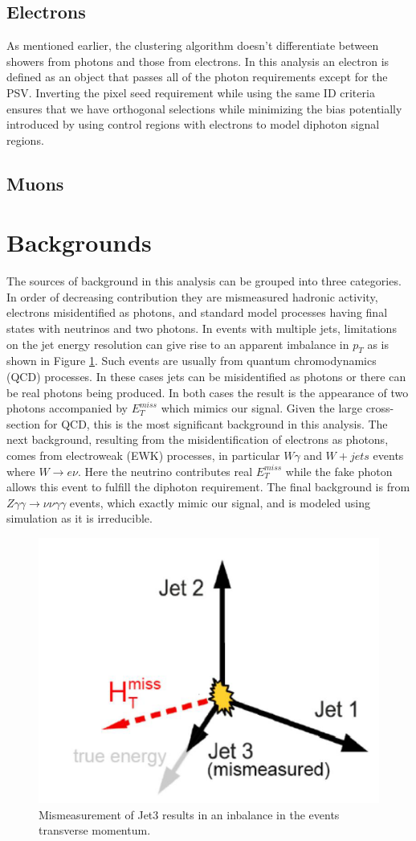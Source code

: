 \subsection{Electrons}
As mentioned earlier, the clustering algorithm doesn't differentiate between showers from photons and those from electrons.  In this analysis an electron is defined as an object that passes all of the photon requirements except for the PSV.  Inverting the pixel seed requirement while using the same ID criteria ensures that we have orthogonal selections while minimizing the bias potentially introduced by using control regions with electrons to model diphoton signal regions. 


\subsection{Muons}

\section{Backgrounds}
The sources of background in this analysis can be grouped into three categories.  In order of decreasing contribution they are mismeasured hadronic activity, electrons misidentified as photons, and standard model processes having final states with neutrinos and two photons.  In events with multiple jets, limitations on the jet energy resolution can give rise to an apparent imbalance in $p_T$ as is shown in Figure \ref{fig:fakemet}.  Such events are usually from quantum chromodynamics (QCD) processes.  In these cases jets can be misidentified as photons or there can be real photons being produced.  In both cases the result is the appearance of two photons accompanied by $E^{miss}_T$ which mimics our signal.  Given the large cross-section for QCD, this is the most significant background in this analysis.  The next background, resulting from the misidentification of electrons as photons, comes from electroweak (EWK) processes, in particular $W\gamma$ and $W + jets$ events where $W \rightarrow e\nu$.  Here the neutrino contributes real $E^{miss}_T$ while the fake photon allows this event to fulfill the diphoton requirement.  The final background is from $Z\gamma \gamma \rightarrow \nu \nu \gamma \gamma$ events, which exactly mimic our signal, and is modeled using simulation as it is irreducible.

\begin{figure}
	\centering
	\includegraphics[width=0.5\linewidth]{Figures/FakeMET}
	\caption{Mismeasurement of Jet3 results in an inbalance in the events transverse momentum.}
	\label{fig:fakemet}
\end{figure}


